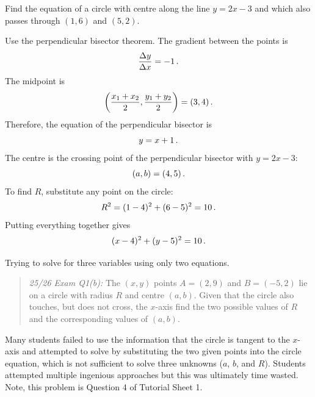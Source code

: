 \goodbreak
\begin{example}[Lecture]
Find the equation of a circle with centre along the line $y=2x-3$ and which also passes through $(1,6)$ and $(5,2)$.
\end{example}
%
\begin{solution}
Use the perpendicular bisector theorem. The gradient between the points is
\[
\frac{\Delta y}{\Delta x}=-1 \,.
\]
The midpoint is
\[
\left(\frac{x_1+x_2}{2},\frac{y_1+y_2}{2}\right)=(3,4)\, .
\]
Therefore, the equation of the perpendicular bisector is
\[
y=x+1\, .
\]
The centre is the crossing point of the perpendicular bisector with $y=2x-3$:
\[
(a,b)=(4,5)\,.
\]
To find $R$, substitute any point on the circle:
\[
R^2=(1-4)^2+(6-5)^2=10\,.
\]
Putting everything together gives
\[
(x-4)^2+(y-5)^2=10 \,.
\]
\end{solution}

\begin{exammistake}
    Trying to solve for three variables using only two equations. 
    \begin{quote}
        \textit{25/26 Exam Q1(b):}
        The $(x,y)$ points $A=(2, 9)$ and $B=(-5,2)$ lie on a circle with radius $R$ and centre $(a,b)$. Given that the circle also touches, but does not cross, the $x$-axis find the two possible values of $R$ and the corresponding values of $(a, b)$.
    \end{quote}
    Many students failed to use the information that the circle is tangent to the $x$-axis and attempted to solve by substituting the two given points into the circle equation, which is not sufficient to solve three unknowns ($a$, $b$, and $R$).
    Students attempted multiple ingenious approaches but this was ultimately time wasted.
    Note, this problem is Question 4 of Tutorial Sheet 1.
\end{exammistake} 


